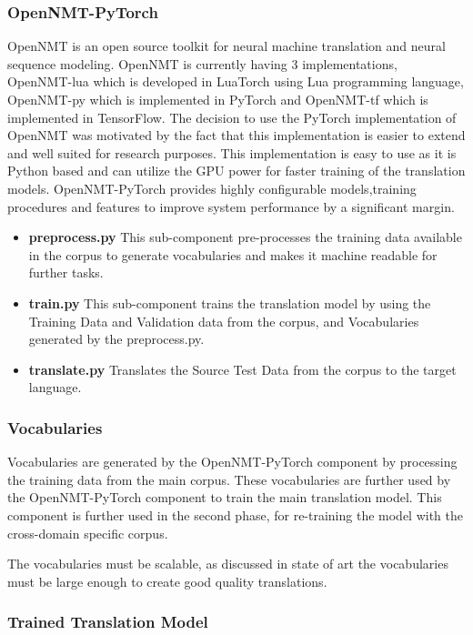 \subsubsection{OpenNMT-PyTorch}
\label{sec:opennmt}
OpenNMT is an open source toolkit for neural machine translation and neural sequence modeling. OpenNMT is currently having 3 implementations, OpenNMT-lua which is developed in LuaTorch using Lua programming language, OpenNMT-py which is implemented in PyTorch and OpenNMT-tf which is implemented in TensorFlow. The decision to use the PyTorch implementation of OpenNMT was motivated by the fact that this implementation is easier to extend and well suited for research purposes. This implementation is easy to use as it is Python based and can utilize the GPU power for faster training of the translation models. OpenNMT-PyTorch provides highly configurable models,training procedures and features to improve system performance by a significant margin.

\begin{itemize}
    \item \textbf{preprocess.py} This sub-component pre-processes the training data available in the corpus to generate vocabularies and makes it machine readable for further tasks.
    \item \textbf{train.py} This sub-component trains the translation model by using the Training Data and Validation data from the corpus, and Vocabularies generated by the preprocess.py.
    \item \textbf{translate.py} Translates the Source Test Data from the corpus to the target language.
\end{itemize}

\subsubsection{Vocabularies} 
Vocabularies are generated by the OpenNMT-PyTorch component by processing the training data from the main corpus. These vocabularies are further used by the OpenNMT-PyTorch component to train the main translation model. This component is further used in the second phase, for re-training the model with the cross-domain specific corpus.

The vocabularies must be scalable, as discussed in state of art the vocabularies must be large enough to create good quality translations. 

\subsubsection{Trained Translation Model} 

